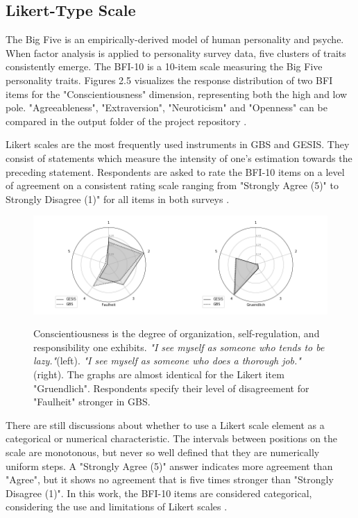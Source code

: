 \subsection{Likert-Type Scale}

The Big Five is an empirically-derived model of human personality and psyche. When factor analysis is applied to personality survey data, five clusters of traits consistently emerge. The BFI-10 is a 10-item scale measuring the Big Five personality traits. Figures 2.5 visualizes the response distribution of two BFI items for the "Conscientiousness" dimension, representing both the high and low pole. "Agreeableness", "Extraversion", "Neuroticism" and "Openness" can be compared in the output folder of the project repository \cite{rammstedt}. 

Likert scales are the most frequently used instruments in GBS and GESIS. They consist of statements which measure the intensity of one's estimation towards the preceding statement. Respondents are asked to rate the BFI-10 items on a level of agreement on a consistent rating scale ranging from "Strongly Agree (5)" to Strongly Disagree (1)" for all items in both surveys \cite{likert}. 

\begin{figure}[H]
	\begin{center}
		\captionsetup{width= 380pt}
		\includegraphics[scale=0.48,angle=0]{fig/Conscientiousness_figure}
		\label{Conscientiousness}
		\caption{Conscientiousness is the degree of organization, self-regulation, and responsibility one exhibits. \textit{"I see myself as someone who tends to be lazy."}(left). \textit{"I see myself as someone who does a thorough job."}(right). The graphs are almost identical for the Likert item "Gruendlich". Respondents specify their level of disagreement for "Faulheit" stronger in GBS.}
	\end{center}
\end{figure}

There are still discussions about whether to use a Likert scale element as a categorical or numerical characteristic. The intervals between positions on the scale are monotonous, but never so well defined that they are numerically uniform steps. A "Strongly Agree (5)" answer indicates more agreement than "Agree", but it shows no agreement that is five times stronger than "Strongly Disagree (1)". In this work, the BFI-10 items are considered categorical, considering the use and limitations of Likert scales \cite{likert2, likert3}.

